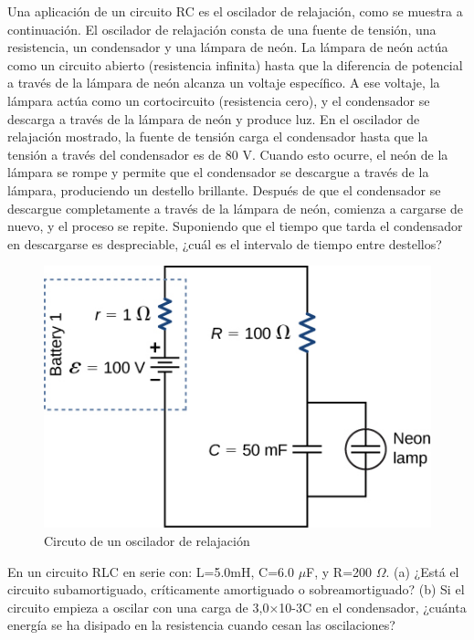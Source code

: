 \documentclass[10pt, legalpaper]{exam}
\begin{document}
\begin{questions}
\addpoints
\question[5]  Una aplicación de un circuito RC es el oscilador de relajación, como se muestra a continuación. El oscilador de relajación consta de una fuente de tensión, una resistencia, un condensador y una lámpara de neón. La lámpara de neón actúa como un circuito abierto (resistencia infinita) hasta que la diferencia de potencial a través de la lámpara de neón alcanza un voltaje específico. A ese voltaje, la lámpara actúa como un cortocircuito (resistencia cero), y el condensador se descarga a través de la lámpara de neón y produce luz. En el oscilador de relajación mostrado, la fuente de tensión carga el condensador hasta que la tensión a través del condensador es de 80 V. Cuando esto ocurre, el neón de la lámpara se rompe y permite que el condensador se descargue a través de la lámpara, produciendo un destello brillante. Después de que el condensador se descargue completamente a través de la lámpara de neón, comienza a cargarse de nuevo, y el proceso se repite. Suponiendo que el tiempo que tarda el condensador en descargarse es despreciable, ¿cuál es el intervalo de tiempo entre destellos?

	\begin{figure}[h]
	    \centering
	    \includegraphics[width=0.5\linewidth]{CNX_UPhysics_27_05_Ex1_img.jpg}
	    \caption{Circuto de un oscilador de relajación}
	    \label{fig:enter-label}
	\end{figure}
\addpoints

\addpoints
\question[5] En un circuito RLC en serie con: L=5.0mH, C=6.0 $\mu$F, y  R=200 $\Omega$. (a) ¿Está el circuito subamortiguado, críticamente amortiguado o sobreamortiguado? (b) Si el circuito empieza a oscilar con una carga de 3,0×10-3C en el condensador, ¿cuánta energía se ha disipado en la resistencia cuando cesan las oscilaciones?


\end{questions}
\end{document}
